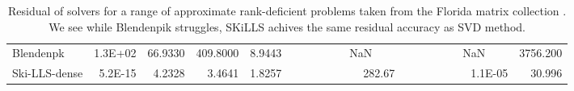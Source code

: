 \documentclass[english,11pt]{article}
\begin{document}
\begin{table}[H]
\begin{tabular}{l|rrrrrrr}
Blendenpk      & 1.3E+02                              & 66.9330              & 409.8000                              & 8.9443               & \multicolumn{1}{l}{~~~~~~~~~~NaN~~~~} & \multicolumn{1}{l}{~~~~~~~~~~NaN~~~~} & 3756.200              \\
Ski-LLS-dense  & 5.2E-15                              & 4.2328               & 3.4641                                & 1.8257               & 282.67                                & 1.1E-05                               & 30.996               
\end{tabular}
\caption{Residual of solvers for a range of approximate rank-deficient problems taken from the Florida matrix collection \cite{10.1145/2049662.2049663}. We see while Blendenpik struggles, SKiLLS achives the same residual accuracy as SVD method.}
\label{tab::rank_def_accuracy}
\end{table}
\end{document}
